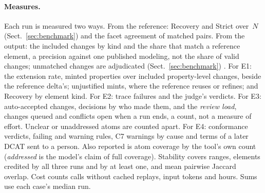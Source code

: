 \paragraph{Measures.} Each run is measured two ways. From the reference: Recovery and Strict over~$N$
(Sect.~\ref{sec:benchmark}) and the facet agreement of matched pairs. From the output: the included changes by
kind and the share that match a reference element, a precision against one published modeling, not the share of
valid changes; unmatched changes are adjudicated (Sect.~\ref{sec:benchmark})
\cite{buckley2004incomplete,zobel1998reliable}. For E1: the extension rate, minted properties over included
property-level changes, beside the reference delta's; unjustified mints, where the reference reuses or refines;
and Recovery by element kind. %
For E2: trace failures and the judge's verdicts. For E3: auto-accepted changes, decisions by who made them, and the
\emph{review load}, changes queued and conflicts open when a run ends, a count, not a measure of effort. Unclear
or unaddressed atoms are counted apart. %
For E4: conformance verdicts, failing and warning rules, C7 warnings by cause and terms of a later \acs{DCAT} sent
to a person. Also reported is atom coverage by the tool's own count (\emph{addressed} is the model's claim of full
coverage). Stability covers ranges, elements credited by all three runs and by at least one, and mean pairwise
Jaccard overlap. Cost counts calls without cached replays, input tokens and hours. Sums use each case's median run.
